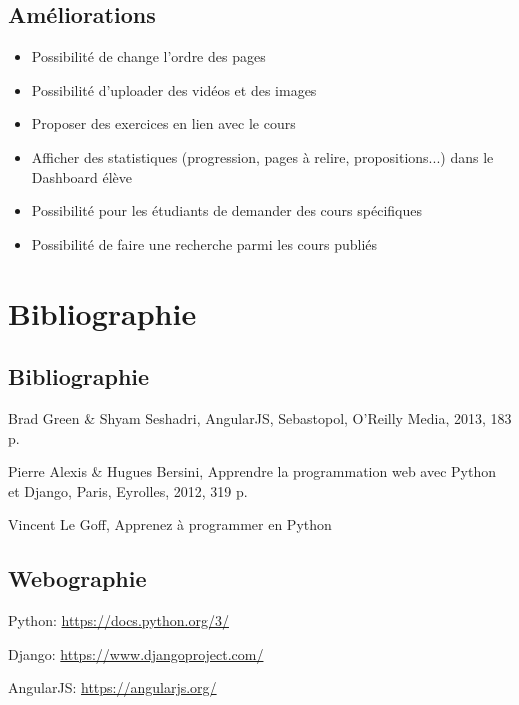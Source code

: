 \documentclass[letterpaper,10pt,oneside]{sphinxmanual}
\begin{document}
\section{Améliorations}
\label{bugs:ameliorations}\begin{itemize}
\item {} 
Possibilité de change l'ordre des pages

\item {} 
Possibilité d'uploader des vidéos et des images

\item {} 
Proposer des exercices en lien avec le cours

\item {} 
Afficher des statistiques (progression, pages à relire, propositions...) dans le Dashboard élève

\item {} 
Possibilité pour les étudiants de demander des cours spécifiques

\item {} 
Possibilité de faire une recherche parmi les cours publiés

\end{itemize}


\chapter{Bibliographie}
\label{bibliographie:bibliographie}\label{bibliographie::doc}

\section{Bibliographie}
\label{bibliographie:id1}
Brad Green \& Shyam Seshadri, AngularJS, Sebastopol, O’Reilly Media, 2013, 183 p.

Pierre Alexis \& Hugues Bersini, Apprendre la programmation web avec Python et Django, Paris, Eyrolles, 2012, 319 p.

Vincent Le Goff, Apprenez à programmer en Python


\section{Webographie}
\label{bibliographie:webographie}
Python: \href{https://docs.python.org/3/}{https://docs.python.org/3/}

Django: \href{https://www.djangoproject.com/}{https://www.djangoproject.com/}

AngularJS: \href{https://angularjs.org/}{https://angularjs.org/}
\end{document}
